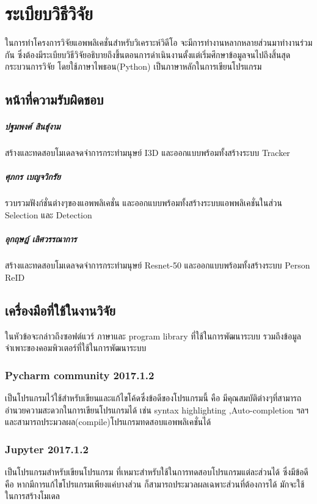 \chapter{ระเบียบวิธีวิจัย}
ในการทําโครงการวิจัยแอพพลิเคชั่นสำหรับวิเคราะห์วิดีโอ
จะมีการทำงานหลากหลายส่วนมาทำงานร่วมกัน ซึ่งต้องมีระเบียบวิธีวิจัยอธิบายถึงขึ้นตอนการดำเนินงานตั้งแต่เริ่มศึกษาข้อมูลจนไปถึงสิ้นสุดกระบวนการวิจัย
โดยใช้ภาษาไพธอน(Python) เป็นภาษาหลักในการเขียนโปรแกรม

\section{หน้าที่ความรับผิดชอบ} 
\paragraph*{ปฐมพงศ์ สินธุ์งาม}
สร้างและทดสอบโมเดลจดจำการกระทำมนุษย์ I3D และออกแบบพร้อมทั้งสร้างระบบ Tracker
\paragraph*{ศุภกร เบญจวิกรัย}
รวบรวมฟังก์ชั่นต่างๆของแอพพลิเคชั่น และออกแบบพร้อมทั้งสร้างระบบแอพพลิเคชั่นในส่วน Selection และ Detection
\paragraph*{อุกฤษฎ์ เลิศวรรณาการ}
สร้างและทดสอบโมเดลจดจำการกระทำมนุษย์ Resnet-50 และออกแบบพร้อมทั้งสร้างระบบ Person ReID 

\vspace{6mm}
\section{เครื่องมือที่ใช้ในงานวิจัย}
ในหัวข้อจะกล่าวถึงซอฟต์แวร์ ภาษาและ program library ที่ใช้ในการพัฒนาระบบ
รวมถึงข้อมูลจำเพาะของคอมพิวเตอร์ที่ใช้ในการพัฒนาระบบ
\subsection*{Pycharm community 2017.1.2} 
เป็นโปรแกรมไว้ใช้สำหรับเขียนและแก้ไขโค้ดซึ่งข้อดีของโปรแกรมนี้ คือ มีคุณสมบัติต่างๆที่สามารถอำนวยความสะดวกในการเขียนโปรแกรมได้ เช่น 
syntax highlighting ,Auto-completion ฯลฯ  
และสามารถประมวลผล(compile)โปรแกรมทดสอบแอพพลิเคชั่นได้

\subsection*{Jupyter 2017.1.2} เป็นโปรแกรมสำหรับเขียนโปรแกรม ที่เหมาะสำหรับใช้ในการทดสอบโปรแกรมแต่ละส่วนได้ ซึ่งมีข้อดีคือ 
หากมีการแก้ไขโปรแกรมเพียงแค่บางส่วน ก็สามารถประมวลผลเฉพาะส่วนที่ต้องการได้
มักจะใช้ในการสร้างโมเดล 

